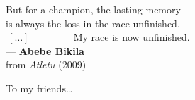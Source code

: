 \cleardoublepage
\thispagestyle{empty}


\vspace*{3cm}

\begin{raggedleft}
    But for a champion, the lasting memory \\
    is always the loss in the race unfinished. \\
	$\ [ \dots ] \  \mspace{70mu} $
    My race is now unfinished. \\
     ---\textbf{ Abebe Bikila}\\
     from \textit{Atletu} (2009)\\
\end{raggedleft}

\vspace{4cm}

\begin{center}
    To my friends\dots
\end{center}


